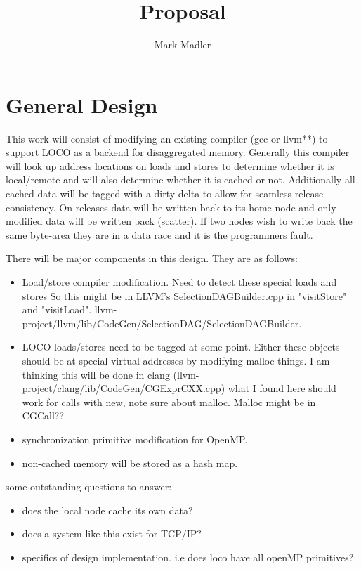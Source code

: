 \documentclass[sigplan,nonacm]{acmart}
\title{Proposal}
\author{Mark Madler}
\begin{document}
\maketitle

\section{General Design}
This work will consist of modifying an existing compiler (gcc or llvm**) to 
support LOCO as a backend for disaggregated memory. Generally this compiler will 
look up address locations on loads and stores to determine whether it is local/remote 
and will also determine whether it is cached or not. Additionally all cached data will 
be tagged with a dirty delta to allow for seamless release consistency. On releases 
data will be written back to its home-node and only modified data will be written back 
(scatter). If two nodes wish to write back the same byte-area they are in a data race 
and it is the programmers fault. 

There will be {} major components in this design. They are as follows:

\begin{itemize}
    \item Load/store compiler modification. Need to detect these special loads and stores
    So this might be in LLVM's SelectionDAGBuilder.cpp in "visitStore" and "visitLoad". 
    llvm-project/llvm/lib/CodeGen/SelectionDAG/SelectionDAGBuilder.
    \item LOCO loads/stores need to be tagged at some point. Either these objects should 
    be at special virtual addresses by modifying malloc things. I am thinking this will be 
    done in clang (llvm-project/clang/lib/CodeGen/CGExprCXX.cpp) what I found here should work 
    for calls with new, note sure about malloc. Malloc might be in CGCall??
    \item synchronization primitive modification for OpenMP.
    \item non-cached memory will be stored as a hash map.
\end{itemize}


some outstanding questions to answer:
\begin{itemize}
    \item does the local node cache its own data?
    \item does a system like this exist for TCP/IP?
    \item specifics of design implementation. i.e does loco have all openMP primitives?
\end{itemize}
\end{document}
